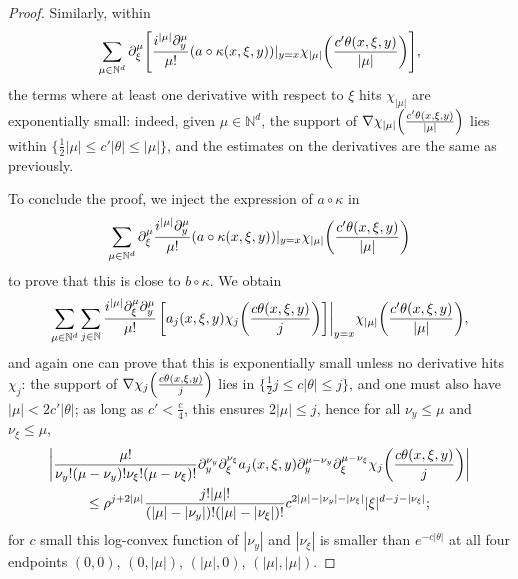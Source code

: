\documentclass[AHL,Unicode,longabstracts,published]{cedram}
\newcommand\1{\mathds{1}}
\newcommand{\N}{\mathbb{N}}
\let\originalleft\left
\let\originalright\right
\renewcommand{\left}{\mathopen{}\mathclose\bgroup\originalleft}
\renewcommand{\right}{\aftergroup\egroup\originalright}
\begin{document}
\begin{proof}
Similarly, within
\[
\sum_{\mu\in
\N^d}\partial_{\xi}^{\mu}\left[\frac{i^{|\mu|}\partial_y^{\mu}}{\mu!}(a\circ
\kappa(x,\xi,y))|_{y=x}\chi_{|\mu|}\left(\frac{c'\theta(x,\xi,y)}{|\mu|}\right)\right],
\]
the terms where at least one derivative with respect to $\xi$ hits $\chi_{|\mu|}$ are exponentially small: indeed, given $\mu\in \N^d$, the support of $\nabla
\chi_{|\mu|}\left(\frac{c'\theta(x,\xi,y)}{|\mu|}\right)$ lies within $\{\frac 12 |\mu|\leq c'|\theta|\leq |\mu|\}$, and the estimates on the derivatives are the same as previously.

To conclude the proof, we inject the expression of $a\circ \kappa$ in
\[
\sum_{\mu\in
\N^d}\partial_{\xi}^{\mu}\frac{i^{|\mu|}\partial_y^{\mu}}{\mu!}(a\circ
\kappa(x,\xi,y))|_{y=x}\chi_{|\mu|}\left(\frac{c'\theta(x,\xi,y)}{|\mu|}\right)
\]
to prove that this is close to $b\circ \kappa$. We obtain
\[
\sum_{\mu\in \N^d}\sum_{j\in
\N}\frac{i^{|\mu|}\partial_{\xi}^{\mu}\partial_y^{\mu}}{\mu!}\left.\left[a_j(x,\xi,y)\chi_j\left(\frac{c\theta(x,\xi,y)}{j}\right)\right]\right|_{y=x}\chi_{|\mu|}\left(\frac{c'\theta(x,\xi,y)}{|\mu|}\right),
\]
and again one can prove that this is exponentially small unless no derivative hits~$\chi_j$: the support of $\nabla\chi_j\left(\frac{c\theta(x,\xi,y)}{j}\right)$ lies in $\{\frac 12 j\leq c|\theta|\leq j\}$, and one must also have $|\mu|<2c'|\theta|$; as long as $c'<\frac{c}{4}$, this ensures $2|\mu|\leq j$, hence for all $\nu_y\leq \mu$ and $\nu_{\xi}\leq \mu$,
\begin{multline*}
\left|\frac{\mu!}{\nu_y!(\mu-\nu_y)!\nu_{\xi}!(\mu-\nu_{\xi})!}\partial^{\nu_y}_y\partial^{\nu_{\xi}}_\xi a_j(x,\xi,y)\partial^{\mu-\nu_y}_y\partial^{\mu-\nu_{\xi}}_\xi\chi_j\left(\frac{c\theta(x,\xi,y)}{j}\right)\right|\\
\leq \rho^{j+2|\mu|}\frac{j!|\mu|!}{(|\mu|-|\nu_y|)!(|\mu|-|\nu_\xi|)!}c^{2|\mu|-|\nu_y|-|\nu_{\xi}|}|\xi|^{d-j-|\nu_{\xi}|};
\end{multline*}
for $c$ small this log-convex function of $|\nu_y|$ and $|\nu_{\xi}|$ is smaller than $e^{-c|\theta|}$ at all four endpoints $(0,0)$, $(0,|\mu|)$, $(|\mu|,0)$, $(|\mu|,|\mu|)$.


\end{proof}
\end{document}
